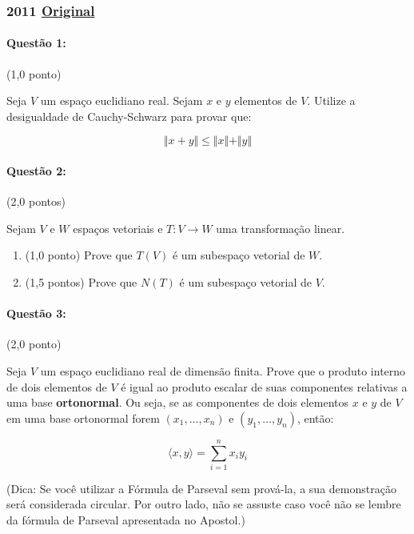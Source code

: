\documentclass[12pt,a4paper]{article}
\newcommand{\norm}[1]{\Vert #1 \Vert}
\newcommand{\original}[1]{\tiny \href{#1}{Original} \normalsize}
\begin{document}
\newpage
\subsubsection{2011 \original{https://drive.google.com/file/d/1FP-ZBEWCjyx32t3fcMYN4H2FlOD6znPP/view?usp=sharing}}

\paragraph{Questão 1:} (1,0 ponto)

Seja $V$ um espaço euclidiano real. Sejam $x$ e $y$ elementos de $V$. Utilize a desigualdade de Cauchy-Schwarz para provar que: 

$$ \norm{x+y} \leq \norm{x} + \norm{y} $$

\paragraph{Questão 2:} (2,0 pontos)

Sejam $V$ e $W$ espaços vetoriais e $T:V \rightarrow W$ uma transformação linear.

\begin{enumerate}[label=(\alph*)]

\item (1,0 ponto) Prove que $T(V)$ é um subespaço vetorial de $W$.

\item (1,5 pontos) Prove que $N(T)$ é um subespaço vetorial de $V$.

\end{enumerate}

\paragraph{Questão 3:} (2,0 ponto)

Seja $V$ um espaço euclidiano real de dimensão finita. Prove que o produto interno de dois elementos de $V$ é igual ao produto escalar de suas componentes relativas a uma base \textbf{ortonormal}. Ou seja, se as componentes de dois elementos $x$ e $y$ de $V$ em uma base ortonormal forem $(x_1,\dots,x_n)$ e $(y_1,\dots,y_n)$, então:

$$ \langle x,y \rangle = \sum_{i=1}^n x_i y_i$$

(Dica: Se você utilizar a Fórmula de Parseval sem prová-la, a sua demonstração será considerada circular. Por outro lado, não se assuste caso você não se lembre da fórmula de Parseval apresentada no Apostol.)
\end{document}
